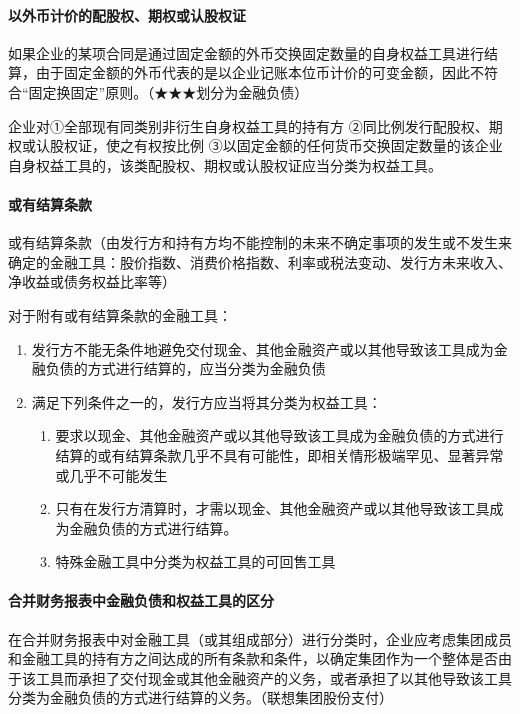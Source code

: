 \documentclass[UTF8,12pt]{ctexart}
\numberwithin{equation}{section} %
\numberwithin{figure}{section}
\numberwithin{table}{section}
\begin{document}
	
	\paragraph{以外币计价的配股权、期权或认股权证}
	如果企业的某项合同是通过固定金额的外币交换固定数量的自身权益工具进行结算，由于固定金额的外币代表的是以企业记账本位币计价的可变金额，因此不符合“固定换固定”原则。（★★★划分为金融负债）
	
	企业对①全部现有同类别非衍生自身权益工具的持有方
	②同比例发行配股权、期权或认股权证，使之有权按比例
	③以固定金额的任何货币交换固定数量的该企业自身权益工具的，该类配股权、期权或认股权证应当分类为权益工具。
	
	\paragraph{或有结算条款}
	
	或有结算条款（由发行方和持有方均不能控制的未来不确定事项的发生或不发生来确定的金融工具：股价指数、消费价格指数、利率或税法变动、发行方未来收入、净收益或债务权益比率等）
	
	对于附有或有结算条款的金融工具：
	\begin{enumerate}
		\item 发行方不能无条件地避免交付现金、其他金融资产或以其他导致该工具成为金融负债的方式进行结算的，应当分类为金融负债
		
		\item 满足下列条件之一的，发行方应当将其分类为权益工具：
		\begin{enumerate}
			\item 要求以现金、其他金融资产或以其他导致该工具成为金融负债的方式进行结算的或有结算条款几乎不具有可能性，即相关情形极端罕见、显著异常或几乎不可能发生
			
			\item 只有在发行方清算时，才需以现金、其他金融资产或以其他导致该工具成为金融负债的方式进行结算。
			
			\item 特殊金融工具中分类为权益工具的可回售工具
		\end{enumerate}
	\end{enumerate}
	
	\paragraph{合并财务报表中金融负债和权益工具的区分}
	在合并财务报表中对金融工具（或其组成部分）进行分类时，企业应考虑集团成员和金融工具的持有方之间达成的所有条款和条件，以确定集团作为一个整体是否由于该工具而承担了交付现金或其他金融资产的义务，或者承担了以其他导致该工具分类为金融负债的方式进行结算的义务。（联想集团股份支付）
	
\end{document}
